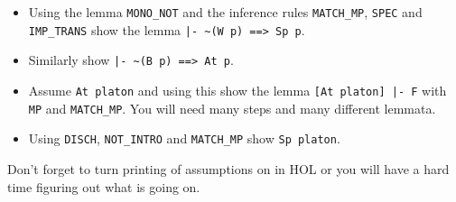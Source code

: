 \documentclass[a4paper,10pt,oneside]{scrartcl}
\begin{document}
\begin{itemize}
\item Using the lemma \texttt{MONO\_NOT} and the inference rules \texttt{MATCH\_MP}, 
\texttt{SPEC} and \texttt{IMP\_TRANS} show the lemma \verb#|- ~(W p) ==> Sp p#.
\item Similarly show \verb#|- ~(B p) ==> At p#.
\item Assume \verb#At platon# and using this show the lemma \verb#[At platon] |- F# with
  \texttt{MP} and \texttt{MATCH\_MP}. You will need many steps and many different lemmata.
\item Using \texttt{DISCH}, \texttt{NOT\_INTRO} and \texttt{MATCH\_MP} show \verb#Sp platon#.
\end{itemize}

Don't forget to turn printing of assumptions on in HOL or you will have a hard time figuring out what is going on.
\end{document}
